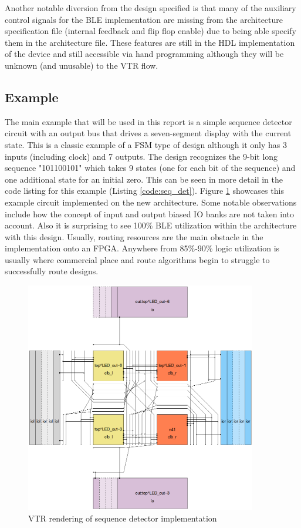 \documentclass[12pt]{article}
\begin{document}
Another notable diversion from the design specified is that many of the auxiliary control 
signals for the BLE implementation are missing from the architecture specification file
(internal feedback and flip flop enable) due to being able specify them in the architecture file.
These features are still in the HDL implementation of the device and still accessible via hand
programming although they will be unknown (and unusable) to the VTR flow.

\subsection{Example}

The main example that will be used in this report is a simple sequence detector circuit
with an output bus that drives a seven-segment display with the current state. This is
a classic example of a FSM type of design although it only has 3 inputs (including clock)
and 7 outputs. The design recognizes the 9-bit long sequence "101100101" which takes
9 states (one for each bit of the sequence) and one additional state for an initial zero.
This can be seen in more detail in the code listing for this example (Listing \ref{code:seq_det}).
Figure \ref{fig:seq_det} showcases this example circuit implemented on the new architecture.
Some notable observations include how the concept of input and output biased IO banks
are not taken into account. Also it is surprising to see 100\% BLE utilization
within the architecture with this design. Usually, routing resources are the main
obstacle in the implementation onto an FPGA. Anywhere from 85\%-90\% logic utilization
is usually where commercial place and route algorithms begin to struggle to successfully
route designs.

\begin{figure}[H]
    \centering
    \includegraphics[width=0.9\textwidth]{seq_det}
    \caption{VTR rendering of sequence detector implementation}
    \label{fig:seq_det}
\end{figure}
\end{document}
